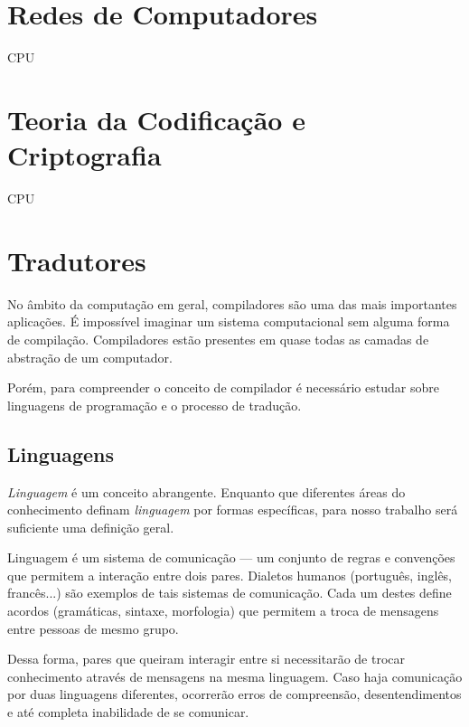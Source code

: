 \section{Redes de Computadores}

CPU

\section{Teoria da Codificação e Criptografia}

CPU

\section{Tradutores}

No âmbito da computação em geral, compiladores são uma das mais importantes
aplicações.  É impossível imaginar um sistema computacional sem alguma forma de
compilação. Compiladores estão presentes em quase todas as camadas de abstração
de um computador.

Porém, para compreender o conceito de compilador é necessário estudar sobre
linguagens de programação e o processo de tradução.

\subsection{Linguagens}

\textit{Linguagem} é um conceito abrangente. Enquanto que diferentes áreas do
conhecimento definam \textit{linguagem} por formas específicas, para nosso
trabalho será suficiente uma definição geral.

Linguagem é um sistema de comunicação --- um conjunto de regras e convenções que
permitem a interação entre dois pares. Dialetos humanos (português, inglês,
francês...) são exemplos de tais sistemas de comunicação. Cada um destes define
acordos (gramáticas, sintaxe, morfologia) que permitem a troca de mensagens
entre pessoas de mesmo grupo.

Dessa forma, pares que queiram interagir entre si necessitarão de trocar
conhecimento através de mensagens na mesma linguagem. Caso haja comunicação por
duas linguagens diferentes, ocorrerão erros de compreensão, desentendimentos e
até completa inabilidade de se comunicar.


